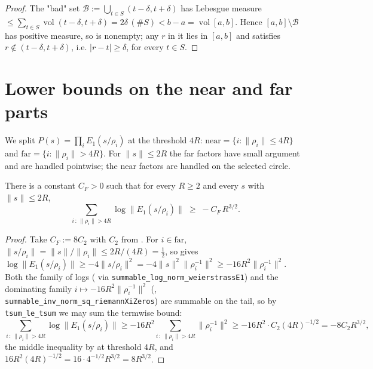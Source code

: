 \begin{proof}
\leanok
The "bad" set $\mathcal B:=\bigcup_{t\in S}(t-\delta,t+\delta)$ has Lebesgue measure
$\le\sum_{t\in S}\operatorname{vol}(t-\delta,t+\delta)=2\delta\,(\#S)<b-a
=\operatorname{vol}[a,b]$. Hence $[a,b]\setminus\mathcal B$ has positive measure, so is
nonempty; any $r$ in it lies in $[a,b]$ and satisfies $r\notin(t-\delta,t+\delta)$, i.e.
$|r-t|\ge\delta$, for every $t\in S$.
\end{proof}

\section{Lower bounds on the near and far parts}
\label{sec:cm_parts}

We split $P(s)=\prod_iE_1(s/\rho_i)$ at the threshold $4R$: $\mathrm{near}=\{i:\|\rho_i\|\le4R\}$
and $\mathrm{far}=\{i:\|\rho_i\|>4R\}$. For $\|s\|\le2R$ the far factors have small argument and are
handled pointwise; the near factors are handled on the selected circle.

\begin{lemma}
\label{lem:cm_far_lower}
\leanok
{}
There is a constant $C_F>0$ such that for every $R\ge2$ and every $s$ with $\|s\|\le2R$,
\[
  \sum_{i\,:\,\|\rho_i\|>4R}\log\|E_1(s/\rho_i)\|\;\ge\;-C_F\,R^{3/2}.
\]
\end{lemma}

\begin{proof}
\leanok
{}
Take $C_F:=8C_2$ with $C_2$ from . For $i\in\mathrm{far}$,
$\|s/\rho_i\|=\|s\|/\|\rho_i\|\le2R/(4R)=\tfrac12$, so  gives
$\log\|E_1(s/\rho_i)\|\ge-4\|s/\rho_i\|^{2}=-4\|s\|^{2}\|\rho_i^{-1}\|^{2}
\ge-16R^{2}\|\rho_i^{-1}\|^{2}$. Both the family of logs ( via
\texttt{summable\_log\_norm\_weierstrassE1}) and the dominating family
$i\mapsto-16R^{2}\|\rho_i^{-1}\|^{2}$ (,
\texttt{summable\_inv\_norm\_sq\_riemannXiZeros}) are summable on the tail, so by
\texttt{tsum\_le\_tsum} we may sum the termwise bound:
\[
  \sum_{i\,:\,\|\rho_i\|>4R}\log\|E_1(s/\rho_i)\|
   \ge-16R^{2}\sum_{i\,:\,\|\rho_i\|>4R}\|\rho_i^{-1}\|^{2}
   \ge-16R^{2}\cdot C_2(4R)^{-1/2}=-8C_2R^{3/2},
\]
the middle inequality by  at threshold $4R$, and
$16R^{2}(4R)^{-1/2}=16\cdot4^{-1/2}R^{3/2}=8R^{3/2}$.
\end{proof}

